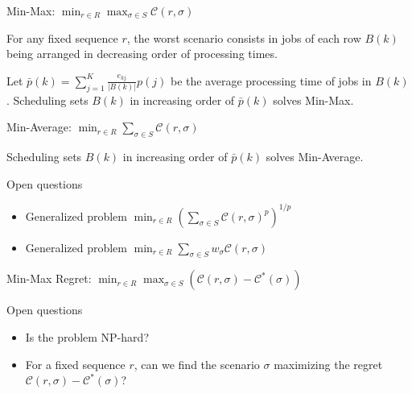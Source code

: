 \documentclass[aspectratio=169]{beamer}
\begin{document}
\begin{frame}{Min-Max: \(\min_{r\in R} \max_{\sigma\in S} \mathcal{C}(r,\sigma)\)}

\begin{lemma}
    For any fixed sequence \(r\), the worst scenario consists in jobs of each row \(B(k)\) being arranged in decreasing order of processing times.
\end{lemma}

\begin{theorem}
    Let \(\bar{p}(k)=\sum_{j=1}^K \frac{e_{kj}}{|B(k)|}p(j)\) be the average processing time of jobs in \(B(k)\).
    Scheduling sets \(B(k)\) in increasing order of \(\bar{p}(k)\) solves Min-Max.
\end{theorem}

\end{frame}


\begin{frame}{Min-Average: \(\min_{r\in R} \sum_{\sigma\in S} \mathcal{C}(r,\sigma)\)}

\begin{theorem}
    Scheduling sets \(B(k)\) in increasing order of \(\bar{p}(k)\) solves Min-Average.
\end{theorem}

\vspace{20pt}

\begin{block}{Open questions}
    \begin{itemize}
        \item Generalized problem \(\min_{r\in R} \left(\sum_{\sigma\in S} \mathcal{C}(r,\sigma)^p\right)^{1/p}\)
        \item Generalized problem \(\min_{r\in R} \sum_{\sigma\in S} w_\sigma \mathcal{C}(r,\sigma)\)
    \end{itemize}
\end{block}

\end{frame}


\begin{frame}{Min-Max Regret: \(\min_{r\in R} \max_{\sigma\in S} \left(\mathcal{C}(r,\sigma)-\mathcal{C}^*(\sigma)\right)\)}

\begin{block}{Open questions}
    \begin{itemize}
        \item Is the problem NP-hard?
        \item For a fixed sequence \(r\), can we find the scenario \(\sigma\) maximizing the regret \(\mathcal{C}(r,\sigma)-\mathcal{C}^*(\sigma)\)?
    \end{itemize}
\end{block}

\end{frame}
\end{document}
